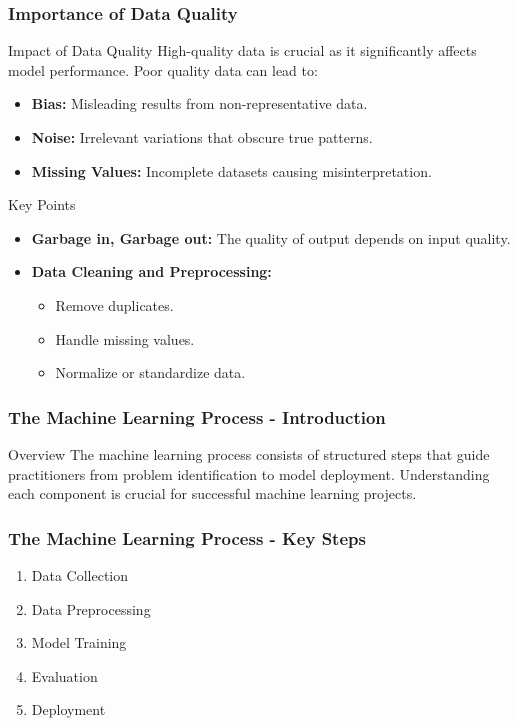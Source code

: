 \documentclass[aspectratio=169]{beamer}
\begin{document}
\begin{frame}[fragile]
    \frametitle{Importance of Data Quality}
    
    \begin{block}{Impact of Data Quality}
        High-quality data is crucial as it significantly affects model performance. Poor quality data can lead to:
        \begin{itemize}
            \item \textbf{Bias:} Misleading results from non-representative data.
            \item \textbf{Noise:} Irrelevant variations that obscure true patterns.
            \item \textbf{Missing Values:} Incomplete datasets causing misinterpretation.
        \end{itemize}
    \end{block}

    \begin{block}{Key Points}
        \begin{itemize}
            \item \textbf{Garbage in, Garbage out:} The quality of output depends on input quality.
            \item \textbf{Data Cleaning and Preprocessing:}
            \begin{itemize}
                \item Remove duplicates.
                \item Handle missing values.
                \item Normalize or standardize data.
            \end{itemize}
        \end{itemize}
    \end{block}

\end{frame}

\begin{frame}[fragile]
    \frametitle{The Machine Learning Process - Introduction}
    \begin{block}{Overview}
        The machine learning process consists of structured steps that guide practitioners from problem identification to model deployment. Understanding each component is crucial for successful machine learning projects.
    \end{block}
\end{frame}

\begin{frame}[fragile]
    \frametitle{The Machine Learning Process - Key Steps}
    \begin{enumerate}
        \item Data Collection
        \item Data Preprocessing
        \item Model Training
        \item Evaluation
        \item Deployment
    \end{enumerate}
\end{frame}
\end{document}
